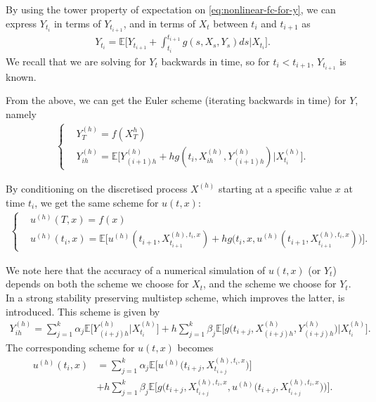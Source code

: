 By using the tower property of expectation on \autoref{eq:nonlinear-fc-for-y}, we can express $Y_{t_i}$ in terms of $Y_{t_{i+1}}$, and in terms of $X_t$ between $t_i$ and $t_{i+1}$ as
%
\begin{align} 
    Y_{t_i} = \mathbb{E}\bigg[ Y_{t_{i+1}} + \int_{t_{i}}^{t_{i+1}}g(s,X_s,Y_s)ds \Big\lvert X_{t_i} \bigg].
\end{align}
%
We recall that we are solving for $Y_t$ backwards in time, so for $t_i < t_{i+1}$, $Y_{t_{i+1}}$ is known.

From the above, we can get the Euler scheme (iterating backwards in time) for $Y$, namely
%
\begin{align} %
    \begin{cases}
    &Y_T^{(h)} = f(X_T^{h})\\
    &Y_{ih}^{(h)} = \mathbb{E}\bigg[ Y_{(i+1)h}^{(h)} + h g(t_i,X_{ih}^{(h)},Y_{(i+1)h}^{(h)}) \Big\lvert X_{t_i}^{(h)} \bigg].
    \end{cases}
\end{align}
%

By conditioning on the discretised process $X^{(h)}$ starting at a specific value $x$ at time $t_i$, we get the same scheme for $u(t,x)$:
%
\begin{align}
    \begin{cases}
    &u^{(h)}(T,x) = f(x)\\
    &u^{(h)}(t_i,x) = \mathbb{E}\bigg[ u^{(h)}(t_{i+1},X^{(h),t_i,x}_{t_{i+1}}) + h g\big( t_i,x,u^{(h)}(t_{i+1},X^{(h),t_i,x}_{t_{i+1}}) \big) \bigg]. 
    \end{cases}
\end{align} 
%

We note here that the accuracy of a numerical simulation of $u(t,x)$ (or $Y_t$) depends on both the scheme we choose for $X_t$, and the scheme we choose for $Y_t$. In \cite{fang2023strong} a strong stability preserving multistep scheme, which improves the latter, is introduced. This scheme is given by
%
\begin{align} %
    Y_{ih}^{(h)} = \sum_{j=1}^{k} \alpha_j \mathbb{E}\bigg[ Y_{(i+j)h}^{(h)} \Big\lvert X_{t_i}^{(h)} \bigg] + h \sum_{j=1}^{k} \beta_j \mathbb{E}\bigg[ g\big(t_{i+j},X_{(i+j)h}^{(h)},Y_{(i+j)h}^{(h)}\big) \Big\lvert X_{t_i}^{(h)} \bigg].
\end{align}
%
The corresponding scheme for $u(t,x)$ becomes
%
\begin{align} 
    u^{(h)}(t_i,x) &= \sum_{j=1}^{k} \alpha_j \mathbb{E}\bigg[ u^{(h)}\Big(t_{i+j},X_{t_{i+j}}^{(h),t_i,x}\Big) \bigg]\\
    &+ h \sum_{j=1}^{k} \beta_j \mathbb{E}\bigg[ g\Big(t_{i+j},X_{t_{i+j}}^{(h),t_i,x},u^{(h)}\big(t_{i+j},X_{t_{i+j}}^{(h),t_i,x}\big)\Big) \bigg].
\end{align}
%

